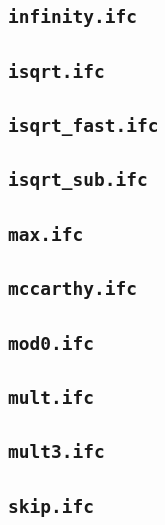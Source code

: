 \subsection{\texttt{infinity.ifc}}


\subsection{\texttt{isqrt.ifc}}


\subsection{\texttt{isqrt\_fast.ifc}}


\subsection{\texttt{isqrt\_sub.ifc}}


\subsection{\texttt{max.ifc}}


\subsection{\texttt{mccarthy.ifc}}


\subsection{\texttt{mod0.ifc}}


\subsection{\texttt{mult.ifc}}


\subsection{\texttt{mult3.ifc}}


\subsection{\texttt{skip.ifc}}


